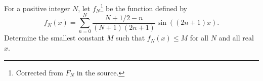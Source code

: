 For a positive integer $N$, let $f_N$\footnote{Corrected from $F_N$ in the source.} be the function defined by 
\[
f_N(x) = \sum_{n=0}^N \frac{N+1/2-n}{(N+1)(2n+1)} \sin((2n+1)x).
\]
Determine the smallest constant $M$ such that $f_N(x) \leq M$ for all $N$ and all real $x$.

